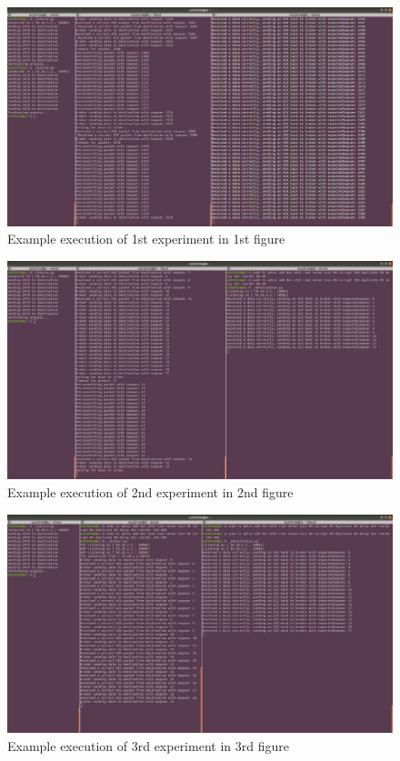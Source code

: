 \documentclass[conference]{IEEEtran}
\begin{document}
\begin{figure}[H]
    \centering
    \includegraphics[scale=0.13]{fig1.png}
    \caption{Example execution of 1st experiment in 1st figure}
\end{figure}

\begin{figure}[H]
    \centering
    \includegraphics[scale=0.13]{fig2.png}
    \caption{Example execution of 2nd experiment in 2nd figure}
\end{figure}

\begin{figure}[H]
    \centering
    \includegraphics[scale=0.13]{fig3.png}
    \caption{Example execution of 3rd experiment in 3rd figure}
\end{figure}
\end{document}
